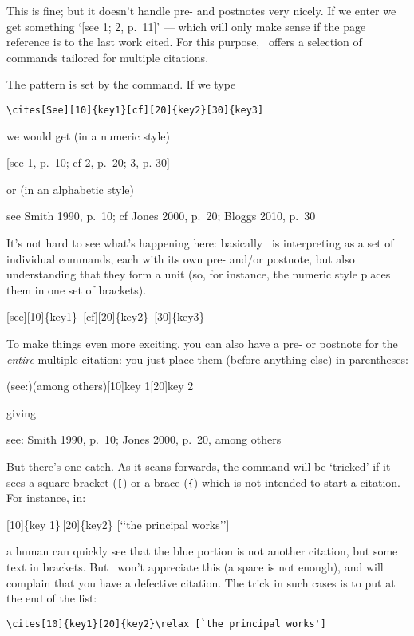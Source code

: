 This is fine; but it doesn't handle pre- and postnotes very nicely. If
we enter  we get something `[see 1;
2, p.~11]' --- which will only make sense if the page reference is
to the last work cited. For this purpose, \biblatex\ offers a
selection of commands tailored for multiple citations.

The pattern is set by the  command. If we type
\begin{center}
\verb|\cites[See][10]{key1}[cf][20]{key2}[30]{key3]|
\end{center}
we would get (in a numeric style)
\begin{center}
[see 1, p.\ 10; cf 2, p.\ 20; 3, p. 30]
\end{center}
or (in an alphabetic style)
\begin{center}
see Smith 1990, p.\ 10; cf Jones 2000, p.\ 20; Bloggs 2010, p.\ 30
\end{center}

It's not hard to see what's happening here: basically \biblatex\ is
interpreting  as a set of individual  commands,
each with its own pre- and/or postnote, but also understanding that
they form a unit (so, for instance, the numeric style places them in
one set of brackets).
\begin{center}
\ttfamily
{}\colorbox{red!30}{[see][10]\{key1\}}\,%
\colorbox{green!30}{[cf][20]\{key2\}}\,%
\colorbox{blue!30}{[30]\{key3\}}
\end{center}

To make things even more exciting, you can also have a pre- or
postnote for the \emph{entire} multiple citation: you just place them
(before anything else) in parentheses:
\begin{center}
\ttfamily
{}(see:)(among others)[10]{key 1}[20]{key 2}
\end{center}
giving
\begin{center}
see: Smith 1990, p.\ 10; Jones 2000, p.\ 20, among others
\end{center}

But there's one catch. As it scans forwards, the  command will
be `tricked' if it sees a square bracket (\texttt[) or a brace
(\texttt\{) which is not intended to start a citation. For instance,
in:
\begin{center}
\ttfamily
{}\colorbox{red!30}{[10]\{key
  1\}}\,\colorbox{green!30}{[20]\{key2\}}
\colorbox{blue!30}{[`{}`the principal works'{}']}
\end{center}
a human can quickly see that the blue portion is not another
citation, but some text in brackets. But \biblatex\ won't appreciate
this (a space is not enough), and will complain that you have a
defective citation. The trick in such cases is to put  at
the end of the list:
\begin{center}
\verb|\cites[10]{key1}[20]{key2}\relax [`the principal works']|
\end{center}

